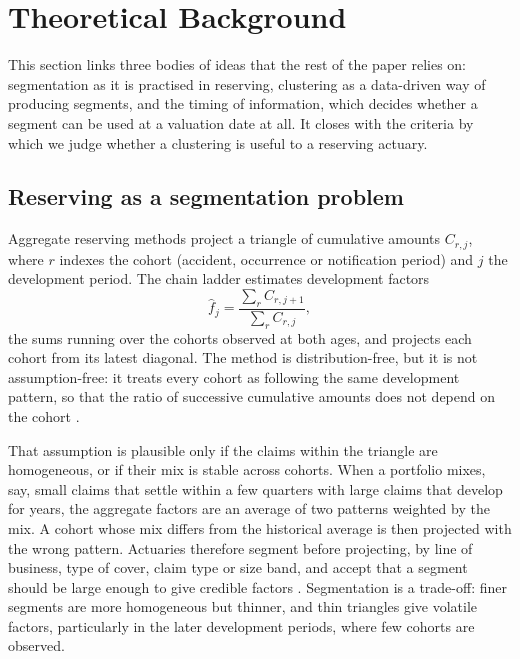 \section{Theoretical Background}
\label{theory}

This section links three bodies of ideas that the rest of the paper relies on: segmentation as it is practised in reserving, clustering as a data-driven way of producing segments, and the timing of information, which decides whether a segment can be used at a valuation date at all. It closes with the criteria by which we judge whether a clustering is useful to a reserving actuary.

\subsection{Reserving as a segmentation problem}
\label{sec:segmentation}

Aggregate reserving methods project a triangle of cumulative amounts $C_{r,j}$, where $r$ indexes the cohort (accident, occurrence or notification period) and $j$ the development period. The chain ladder estimates development factors
\begin{equation}
\hat f_j = \frac{\sum_{r} C_{r,j+1}}{\sum_{r} C_{r,j}},
\label{eq:cl}
\end{equation}
the sums running over the cohorts observed at both ages, and projects each cohort from its latest diagonal. The method is distribution-free, but it is not assumption-free: it treats every cohort as following the same development pattern, so that the ratio of successive cumulative amounts does not depend on the cohort \parencite{mack1993distribution,taylor2000loss}.

That assumption is plausible only if the claims within the triangle are homogeneous, or if their mix is stable across cohorts. When a portfolio mixes, say, small claims that settle within a few quarters with large claims that develop for years, the aggregate factors are an average of two patterns weighted by the mix. A cohort whose mix differs from the historical average is then projected with the wrong pattern. Actuaries therefore segment before projecting, by line of business, type of cover, claim type or size band, and accept that a segment should be large enough to give credible factors \parencite{friedland2010estimating}. Segmentation is a trade-off: finer segments are more homogeneous but thinner, and thin triangles give volatile factors, particularly in the later development periods, where few cohorts are observed.

